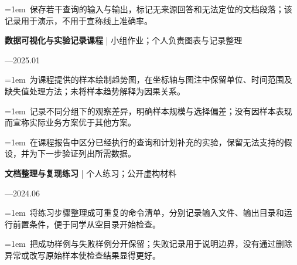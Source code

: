 \documentclass[11pt,a4paper,fontset=fandol]{ctexart}
\begin{document}
\noindent\hangindent=1em\textbullet\ 保存若干查询的输入与输出，标记无来源回答和无法定位的文档段落；该记录用于演示，不用于宣称线上准确率。\par
\par\medskip{}\par\nobreak
\begin{minipage}{\linewidth}
\textbf{数据可视化与实验记录课程} | 小组作业；个人负责图表与记录整理\par
{\small{}—2025.01\par}
\noindent\hangindent=1em\textbullet\ 为课程提供的样本绘制趋势图，在坐标轴与图注中保留单位、时间范围及缺失值处理方法；未将样本趋势解释为因果关系。\par
\end{minipage}\par
\noindent\hangindent=1em\textbullet\ 记录不同分组下的观察差异，明确样本规模与选择偏差；没有因样本表现而宣称实际业务方案优于其他方案。\par
\noindent\hangindent=1em\textbullet\ 在课程报告中区分已经执行的查询和计划补充的实验，保留无法支持的假设，并为下一步验证列出所需数据。\par
\begin{minipage}{\linewidth}
\textbf{文档整理与复现练习} | 个人练习；公开虚构材料\par
{\small{}—2024.06\par}
\noindent\hangindent=1em\textbullet\ 将练习步骤整理成可重复的命令清单，分别记录输入文件、输出目录和运行前置条件，便于同学从空目录开始检查。\par
\end{minipage}\par
\noindent\hangindent=1em\textbullet\ 把成功样例与失败样例分开保留；失败记录用于说明边界，没有通过删除异常或改写原始样本使检查结果显得更好。\par
\end{document}
